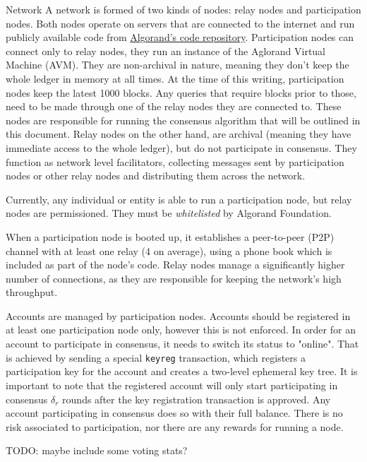 \documentclass[10pt,a4paper]{article}
\begin{document}
\begin{section}{Network}
A network is formed of two kinds of nodes: {\sf relay nodes}
and {\sf participation nodes}. 
Both nodes operate on servers that are connected to the internet and run publicly
available code from \href{https://github.com/algorand/go-algorand}{Algorand's code repository}.
Participation nodes can connect only to relay nodes, they run an instance
of the Aglorand Virtual Machine (AVM).
They are non-archival in nature, meaning they don't keep
the whole ledger in memory at all times. At the time of this writing,
participation nodes keep the latest 1000 blocks.
Any queries that require blocks prior to those, need to be made
through one of the relay nodes they are connected to.
These nodes are responsible for running the consensus algorithm that
will be outlined in this document.
Relay nodes on the other hand, are archival (meaning they have immediate
access to the whole ledger), but do not participate in consensus.
They function as network level facilitators, collecting messages sent by participation
nodes or other relay nodes and distributing them across the network.

Currently, any individual or entity is able to run a participation node, 
but relay nodes are permissioned. They must be {\em whitelisted} by Algorand Foundation.

When a participation node is booted up, it establishes a peer-to-peer (P2P) 
channel with at least one relay (4 on average), using a phone book which is included
as part of the node's code. 
Relay nodes manage a significantly higher number of connections, as they 
are responsible for keeping the network's high throughput.

Accounts are managed by participation nodes. Accounts should be registered in at least one participation
node only, however this is not enforced.
In order for an account to participate in consensus, it needs to switch its status to "online". 
That is achieved by sending a special {\tt keyreg} transaction,
which registers a participation key for the account and creates a two-level ephemeral key tree.
It is important to note that the registered account will only start participating in consensus
$\delta_r$ rounds after the key registration transaction is approved.
Any account participating in consensus does so with their full balance. There is no risk
associated to participation, nor there are any rewards for running a node.

TODO: maybe include some voting stats?

\end{section}
\end{document}
